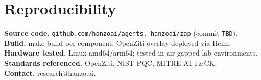 \documentclass[11pt,letterpaper]{article}
\begin{document}
\section*{Reproducibility}
\textbf{Source code.} \texttt{github.com/hanzoai/agents, hanzoai/zap} (commit \texttt{TBD}).\\
\textbf{Build.} make build per component; OpenZiti overlay deployed via Helm.\\
\textbf{Hardware tested.} Linux amd64/arm64; tested in air-gapped lab environments.\\
\textbf{Standards referenced.} OpenZiti, NIST PQC, MITRE ATT\&CK.\\
\textbf{Contact.} research@hanzo.ai.
\end{document}
